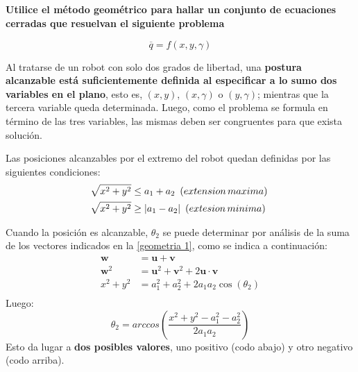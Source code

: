 \documentclass[a4paper,12pt]{article}
\begin{document}
\subsection{}
\textbf{Utilice el método geométrico para hallar un conjunto de ecuaciones cerradas que resuelvan el siguiente problema}

\begin{equation*}
    \overline{q} = f\left(x,y,\gamma\right)
\end{equation*}

Al tratarse de un robot con solo dos grados de libertad, una \textbf{postura alcanzable está suficientemente definida al especificar
a lo sumo dos variables en el plano}, esto es, $\left(x,y\right)$, $\left(x,\gamma\right)$ o $\left(y, \gamma\right)$; mientras que
la tercera variable queda determinada. Luego, como el problema se formula en término de las tres variables, las mismas deben ser congruentes para
que exista solución.

Las posiciones alcanzables por el extremo del robot quedan definidas por las siguientes condiciones:
\begin{equation}
    \begin{aligned}
        \sqrt[]{x^2 + y^2 }&\leq  a_1 + a_2\,\,\, \text(extension\,maxima)\\
        \sqrt[]{x^2 + y^2} & \geq  |a_1 - a_2|\,\,\, \text(extesion\,minima)
    \end{aligned}
    \label{rango}
\end{equation}

Cuando la posición es alcanzable, $\theta_2$ se puede determinar por análisis de la suma de los vectores indicados en la \cref{geometria 1}, como se indica a continuación:
\begin{align*}
    \mathbf{w} &= \mathbf{u} + \mathbf{v}\\
    \mathbf{w}^2 &= \mathbf{u}^2 + \mathbf{v}^2 + 2\mathbf{u}\cdot\mathbf{v}\\
    x^2 + y^2 &= a_{1}^2 + a_{2}^2 + 2a_{1}a_{2}\cos(\theta_2)\\
\end{align*}
Luego:
\begin{equation}
    \theta_2 = arccos\left(\frac{x^2 + y^2 - a_{1}^2 - a_{2}^2}{2a_{1}a_{2}}\right)
    \label{teta2}
\end{equation}
Esto da lugar a \textbf{dos posibles valores}, uno positivo (codo abajo) y otro negativo (codo arriba).
\end{document}
